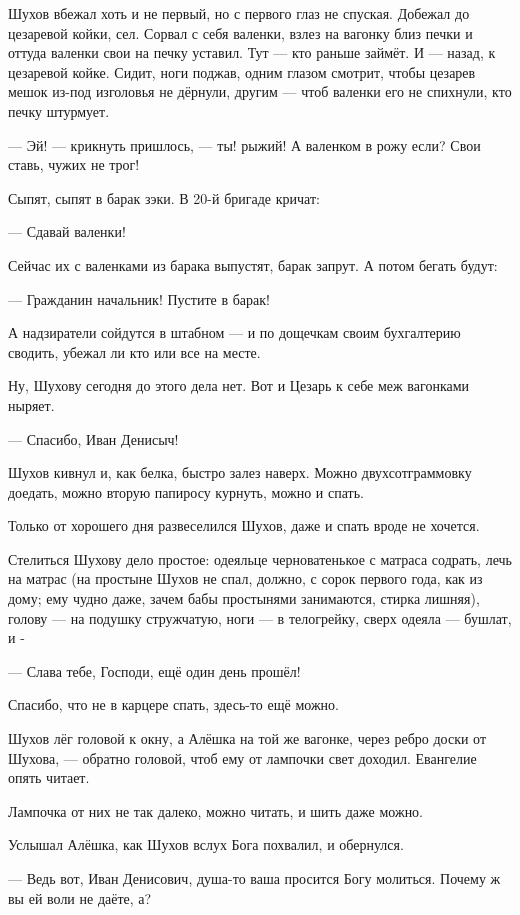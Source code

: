 Шухов вбежал хоть и не первый, но с первого глаз не спуская. Добежал до цезаревой койки, сел. 
Сорвал с себя валенки, взлез на вагонку близ печки и оттуда валенки свои на печку уставил. 
Тут --- кто раньше займёт. И --- назад, к цезаревой койке. Сидит, ноги поджав, одним глазом 
смотрит, чтобы цезарев мешок из-под изголовья не дёрнули, другим --- чтоб валенки его не 
спихнули, кто печку штурмует.

--- Эй! --- крикнуть пришлось, --- ты! рыжий! А валенком в рожу если? Свои ставь, чужих не трог!

Сыпят, сыпят в барак зэки. В 20-й бригаде кричат:

--- Сдавай валенки!

Сейчас их с валенками из барака выпустят, барак запрут. А потом бегать будут:

--- Гражданин начальник! Пустите в барак!

А надзиратели сойдутся в штабном --- и по дощечкам своим бухгалтерию сводить, убежал ли кто 
или все на месте.

Ну, Шухову сегодня до этого дела нет. Вот и Цезарь к себе меж вагонками ныряет.

--- Спасибо, Иван Денисыч!

Шухов кивнул и, как белка, быстро залез наверх. Можно двухсотграммовку доедать, можно вторую 
папиросу курнуть, можно и спать.

Только от хорошего дня развеселился Шухов, даже и спать вроде не хочется.

Стелиться Шухову дело простое: одеяльце черноватенькое с матраса содрать, лечь на матрас (на 
простыне Шухов не спал, должно, с сорок первого года, как из дому; ему чудно даже, зачем бабы 
простынями занимаются, стирка лишняя), голову --- на подушку стружчатую, ноги --- в телогрейку, 
сверх одеяла --- бушлат, и -

--- Слава тебе, Господи, ещё один день прошёл!

Спасибо, что не в карцере спать, здесь-то ещё можно.

Шухов лёг головой к окну, а Алёшка на той же вагонке, через ребро доски от Шухова, --- обратно 
головой, чтоб ему от лампочки свет доходил. Евангелие опять читает.

Лампочка от них не так далеко, можно читать, и шить даже можно.

Услышал Алёшка, как Шухов вслух Бога похвалил, и обернулся.

--- Ведь вот, Иван Денисович, душа-то ваша просится Богу молиться. Почему ж вы ей воли не даёте, 
а?

